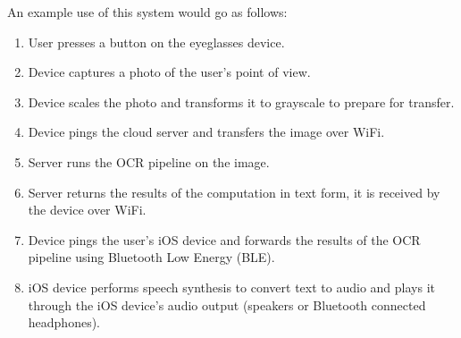 \documentclass[a4paper,11pt]{article}
\begin{document}
\noindent
An example use of this system would go as follows:
\begin{enumerate}
    \item User presses a button on the eyeglasses device.
    \item Device captures a photo of the user's point of view.
    \item Device scales the photo and transforms it to grayscale to prepare for transfer.
    \item Device pings the cloud server and transfers the image over WiFi.
    \item Server runs the OCR pipeline on the image.
    \item Server returns the results of the computation in text form, it is received by the device over WiFi.
    \item Device pings the user's iOS device and forwards the results of the OCR pipeline using Bluetooth Low Energy (BLE).
    \item iOS device performs speech synthesis to convert text to audio and plays it through the iOS device's audio output (speakers or Bluetooth connected headphones).
\end{enumerate}



\end{document}
